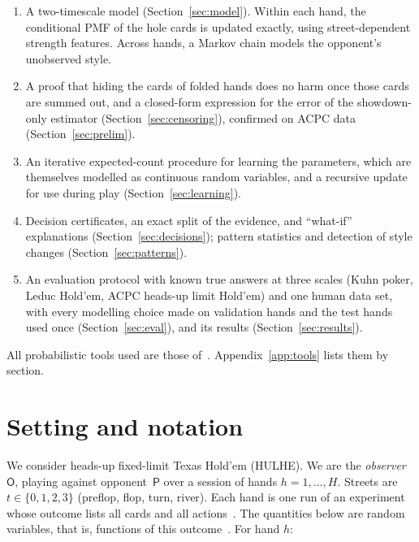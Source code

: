 \documentclass[11pt,a4paper]{article}
\newcommand{\1}{\mathbf{1}}
\newcommand{\BT}[1]{\cite[§#1]{bertsekas2000}}
\begin{document}
\begin{enumerate}
  \item A two-timescale model (Section~\ref{sec:model}). Within each hand, the
        conditional PMF of the hole cards is updated exactly, using
        street-dependent strength features. Across hands, a Markov chain models
        the opponent's unobserved style.
  \item A proof that hiding the cards of folded hands does no harm once those
        cards are summed out, and a closed-form expression for the error of the
        showdown-only estimator (Section~\ref{sec:censoring}), confirmed on ACPC
        data (Section~\ref{sec:prelim}).
  \item An iterative expected-count procedure for learning the parameters, which
        are themselves modelled as continuous random variables, and a recursive
        update for use during play (Section~\ref{sec:learning}).
  \item Decision certificates, an exact split of the evidence, and
        ``what-if'' explanations (Section~\ref{sec:decisions}); pattern
        statistics and detection of style changes (Section~\ref{sec:patterns}).
  \item An evaluation protocol with known true answers at three scales (Kuhn
        poker, Leduc Hold'em, ACPC heads-up limit Hold'em) and one human data
        set, with every modelling choice made on validation hands and the test
        hands used once (Section~\ref{sec:eval}), and its results
        (Section~\ref{sec:results}).
\end{enumerate}

All probabilistic tools used are those of~\cite{bertsekas2000}. Appendix~\ref{app:tools}
lists them by section.

\section{Setting and notation}

We consider heads-up fixed-limit Texas Hold'em (HULHE). We are the
\emph{observer}~$\mathsf{O}$, playing against opponent~$\mathsf{P}$ over a session
of hands $h=1,\dots,H$. Streets are $t\in\{0,1,2,3\}$ (preflop, flop, turn,
river). Each hand is one run of an experiment whose outcome lists all cards and
all actions~\BT{1.2}. The quantities below are random variables, that is,
functions of this outcome~\BT{2.1}. For hand $h$:
\end{document}
